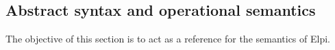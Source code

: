 \documentclass[a4paper, 11pt]{book}
\begin{document}
\subsection{Abstract syntax and operational semantics}\label{sec:sem}

The objective of this section is to act as a reference for
the semantics of Elpi.

\newcommand{\vecL}[1]{\overrightarrow{\vphantom{t}#1}}
\newcommand{\BASE}{\ensuremath{\mathbb{B}}}
\newcommand{\PRED}[1][]{\ensuremath{\mathbb{F}#1}\xspace}
\newcommand{\VAR}[1][]{\ensuremath{\mathbb{V}#1}\xspace}
\newcommand{\APP}[1][]{\ensuremath{\mathbb{Ap}#1}\xspace}
\newcommand{\X}[1][]{\ensuremath{\mathcal{X}#1}\xspace}
\newcommand{\T}[1][]{\ensuremath{tm#1}\xspace}
\newcommand{\V}[1][]{\ensuremath{\mathcal{V}#1}\xspace}
\newcommand{\CHR}[1][]{\ensuremath{\mathbb{C}#1}\xspace}
\newcommand{\CLAUSE}[1][]{\ensuremath{\mathbb{R}}#1\xspace}
\newcommand{\ATOM}[1][]{\ensuremath{\mathbb{A}#1}\xspace}
\newcommand{\A}[1][]{\ensuremath{\mathbb{A}#1}\xspace}
\newcommand{\Ainst}[1][]{\ensuremath{\alpha#1}\xspace}
\newcommand{\bool}[1][]{b}
\newcommand{\B}[1][]{\ensuremath{\mathrm{B}}\xspace}
\newcommand{\F}[1][]{\ensuremath{\mathbb{D}}\xspace}
\newcommand{\subst}[1][]{\ensuremath{\sigma#1}\xspace}
\newcommand{\alt}[1][]{\ensuremath{\mathcal{A}#1}\xspace}
\newcommand{\alts}[1][]{\ensuremath{a#1}\xspace}
\newcommand{\g}[1][]{\ensuremath{\mathcal{G}#1}\xspace}
\newcommand{\clause}[1][]{\ensuremath{\mathcal{@}#1}\xspace}
\newcommand{\pred}[1][]{\ensuremath{p#1}\xspace}
\newcommand{\expr}[1][]{\texttt{e#1}\xspace}
\newcommand{\vars}{\texttt{vars}}
\newcommand{\run}{\texttt{run}}
\newcommand{\fold}{\ensuremath{\mathbf{fold}}\xspace}
\newcommand{\map}{\ensuremath{\mathbf{map}}\xspace}
\newcommand{\call}{\texttt{Call}}
\newcommand{\cut}{\texttt{Cut}\xspace}
\newcommand{\cst}{\texttt{Cst}\xspace}
\newcommand{\unifiable}{\texttt{unifiable}\xspace}
\newcommand{\matchable}{\texttt{matchable}\xspace}
\newcommand{\nUnify}{\texttt{split}\xspace}
\newcommand{\unify}{\texttt{unify}\xspace}
\newcommand{\match}{\texttt{match}\xspace}
\newcommand{\impl}{\texttt{=>}}
\newcommand{\prog}[1][]{\ensuremath{{\pi}#1}\xspace}
\newcommand{\pin}{\texttt{pi}}
\newcommand{\cdash}{\texttt{:-}} %
\newcommand{\Cons}[1]{\ensuremath{#1::}}
\newcommand{\ConsHd}[1]{\ensuremath{(#1::}\xspace}
\newcommand{\ConsTl}[1]{\ensuremath{#1)}\xspace}
\newcommand{\EmptyList}{\ensuremath{\varnothing}}
\newcommand{\ConsHdNP}[1]{\ensuremath{#1::}\xspace}
\newcommand{\ConsTlNP}[1]{\ensuremath{#1}\xspace}
\end{document}
